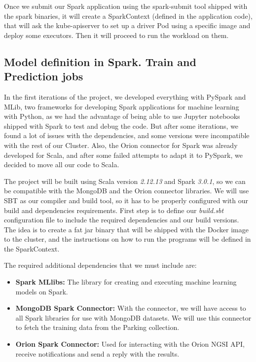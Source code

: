 Once we submit our Spark application using the spark-submit tool shipped with the spark binaries, it will create a SparkContext (defined in the application code), that will ask the kube-apiserver to set up a driver Pod using a specific image and deploy some executors. Then it will proceed to run the workload on them.

\subsection{Model definition in Spark. Train and Prediction jobs}

In the first iterations of the project, we developed everything with PySpark and MLib, two frameworks for developing Spark applications for machine learning with Python, as we had the advantage of being able to use Jupyter notebooks shipped with Spark to test and debug the code. But after some iterations, we found a lot of issues with the dependencies, and some versions were incompatible with the rest of our Cluster. Also, the Orion connector for Spark was already developed for Scala, and after some failed attempts to adapt it to PySpark, we decided to move all our code to Scala.  

The project will be built using Scala version \textit{2.12.13} and Spark \textit{3.0.1}, so we can be compatible with the MongoDB and the Orion connector libraries. We will use SBT \cite{sbt} as our compiler and build tool, so it has to be properly configured with our build and dependencies requirements. First step is to define our \textit{build.sbt} configuration file to include the required dependencies and our build versions. The idea is to create a fat jar binary that will be shipped with the Docker image to the cluster, and the instructions on how to run the programs will be defined in the SparkContext.

The required additional dependencies that we must include are:
\begin{itemize}
    \item \textbf{Spark MLlibs:} The library for creating and executing machine learning models on Spark\cite{ml-spark}.
    \item \textbf{MongoDB Spark Connector:} With the connector, we will have access to all Spark libraries for use with MongoDB datasets. We will use this connector to fetch the training data from the Parking collection.
    \item \textbf{Orion Spark Connector:} Used for interacting with the Orion NGSI API, receive notifications and send a reply with the results.
\end{itemize}


